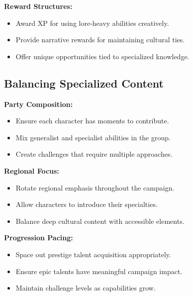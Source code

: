 \textbf{Reward Structures:}
\begin{itemize}
    \item Award XP for using lore‑heavy abilities creatively.
    \item Provide narrative rewards for maintaining cultural ties.
    \item Offer unique opportunities tied to specialized knowledge.
\end{itemize}

\subsection{Balancing Specialized Content}\label{subsec:balancing_content}

\textbf{Party Composition:}
\begin{itemize}
    \item Ensure each character has moments to contribute.
    \item Mix generalist and specialist abilities in the group.
    \item Create challenges that require multiple approaches.
\end{itemize}

\textbf{Regional Focus:}
\begin{itemize}
    \item Rotate regional emphasis throughout the campaign.
    \item Allow characters to introduce their specialties.
    \item Balance deep cultural content with accessible elements.
\end{itemize}

\textbf{Progression Pacing:}
\begin{itemize}
    \item Space out prestige talent acquisition appropriately.
    \item Ensure epic talents have meaningful campaign impact.
    \item Maintain challenge levels as capabilities grow.
\end{itemize}

